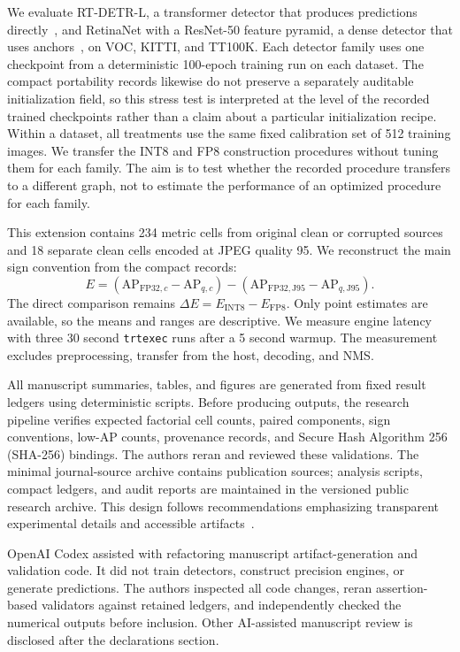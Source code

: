 \documentclass[a4paper,fleqn]{cas-dc}
\newcommand{\AP}{\mathrm{AP}}
\newcommand{\Jclean}{\mathrm{J95}}
\begin{document}
We evaluate RT-DETR-L, a transformer detector that produces predictions directly~\citep{carion2020detr,zhao2024rtdetr}, and RetinaNet with a ResNet-50 feature pyramid, a dense detector that uses anchors~\citep{lin2017focal,torchvision2026retinanet}, on VOC, KITTI, and TT100K. Each detector family uses one checkpoint from a deterministic 100-epoch training run on each dataset. The compact portability records likewise do not preserve a separately auditable initialization field, so this stress test is interpreted at the level of the recorded trained checkpoints rather than a claim about a particular initialization recipe. Within a dataset, all treatments use the same fixed calibration set of 512 training images. We transfer the INT8 and FP8 construction procedures without tuning them for each family. The aim is to test whether the recorded procedure transfers to a different graph, not to estimate the performance of an optimized procedure for each family.

This extension contains 234 metric cells from original clean or corrupted sources and 18 separate clean cells encoded at JPEG quality 95. We reconstruct the main sign convention from the compact records:
\begin{equation}
E=(\AP_{\mathrm{FP32},c}-\AP_{q,c})-
  (\AP_{\mathrm{FP32},\Jclean}-\AP_{q,\Jclean}).
\end{equation}
The direct comparison remains $\Delta E=E_{\mathrm{INT8}}-E_{\mathrm{FP8}}$. Only point estimates are available, so the means and ranges are descriptive. We measure engine latency with three 30 second \texttt{trtexec} runs after a 5 second warmup. The measurement excludes preprocessing, transfer from the host, decoding, and NMS.

All manuscript summaries, tables, and figures are generated from fixed result ledgers using deterministic scripts. Before producing outputs, the research pipeline verifies expected factorial cell counts, paired components, sign conventions, low-AP counts, provenance records, and Secure Hash Algorithm 256 (SHA-256) bindings. The authors reran and reviewed these validations. The minimal journal-source archive contains publication sources; analysis scripts, compact ledgers, and audit reports are maintained in the versioned public research archive. This design follows recommendations emphasizing transparent experimental details and accessible artifacts~\citep{pineau2021reproducibility}.

OpenAI Codex assisted with refactoring manuscript artifact-generation and validation code. It did not train detectors, construct precision engines, or generate predictions. The authors inspected all code changes, reran assertion-based validators against retained ledgers, and independently checked the numerical outputs before inclusion. Other AI-assisted manuscript review is disclosed after the declarations section.
\end{document}
